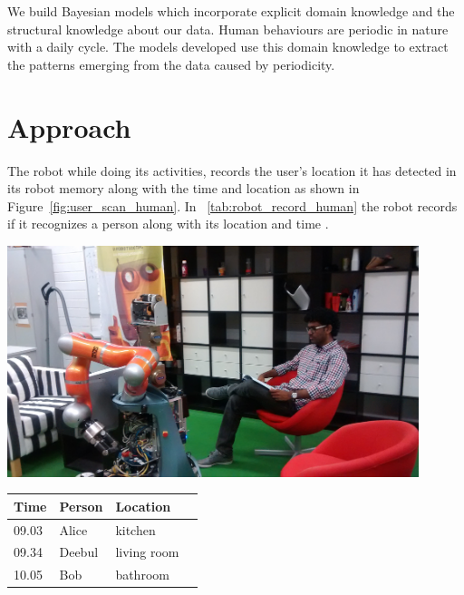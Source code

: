We build Bayesian models which incorporate explicit domain knowledge and the structural knowledge about our data. Human behaviours are periodic in nature with a daily cycle. The models developed use this domain knowledge to extract the patterns emerging from the data caused by periodicity.

\section{Approach}

The robot while doing its activities, records the user's location it has detected in its robot memory along with the time and location as shown in Figure~\ref{fig:user_scan_human}. In ~\ref{tab:robot_record_human} the robot records if it recognizes a person along with its location and time .

  \begin{minipage}{\textwidth}
  \begin{minipage}[b]{0.49\textwidth}
    \centering
        \includegraphics[width=0.9\textwidth]{images/cleaning_1.jpg}
    \label{fig:user_scan_human}
  \end{minipage}
  \hfill
  \begin{minipage}[b]{0.49\textwidth}
    \centering
    \begin{tabular}{|l|l|l|l|}
        \hline
	        Time & Person & Location \\
        \hline
        \hline
	        09.03 & Alice & kitchen \\
        \hline
	        09.34 & Deebul & living room \\
        \hline
	        10.05 & Bob & bathroom \\
        \hline
	        
        \end{tabular}
      \label{tab:robot_record_human}
    \end{minipage}
  \end{minipage}

